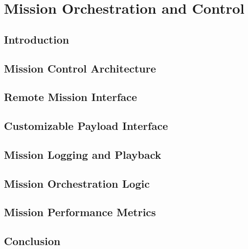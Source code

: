 \chapter{Mission Orchestration and Control}

\section{Introduction}

\section{Mission Control Architecture}

\section{Remote Mission Interface }

\section{Customizable Payload Interface }

\section{Mission Logging and Playback }

\section{Mission Orchestration Logic}

\section{Mission Performance Metrics}

\section{Conclusion}

